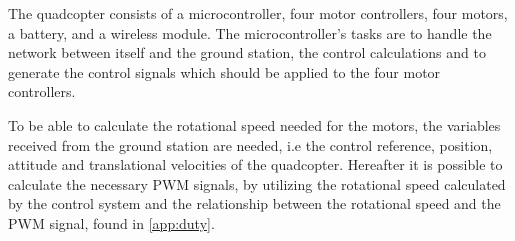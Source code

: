 The quadcopter consists of a microcontroller, four motor controllers, four motors, a battery, and a wireless module. The microcontroller's tasks are to handle the network between itself and the ground station, the control calculations and to generate the control signals which should be applied to the four motor controllers.

To be able to calculate the rotational speed needed for the motors, the variables received from the ground station are needed, i.e the control reference, position, attitude and translational velocities of the quadcopter. Hereafter it is possible to calculate the necessary PWM signals, by utilizing the rotational speed calculated by the control system and the relationship between the rotational speed and the PWM signal, found in \autoref{app:duty}.
\vspace{-1.5 cm}